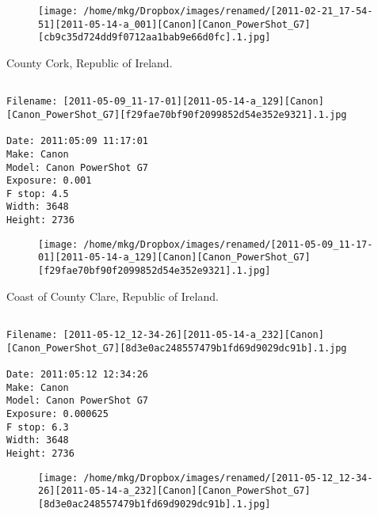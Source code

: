 \begin{figure}
\texttt{[image: /home/mkg/Dropbox/images/renamed/[2011-02-21\_17-54-51][2011-05-14-a\_001][Canon][Canon\_PowerShot\_G7][cb9c35d724dd9f0712aa1bab9e66d0fc].1.jpg]}
\end{figure}
    
\clearpage
\onecolumn
\noindent County Cork, Republic of Ireland.
\noindent
\begin{lstlisting}

Filename: [2011-05-09_11-17-01][2011-05-14-a_129][Canon][Canon_PowerShot_G7][f29fae70bf90f2099852d54e352e9321].1.jpg

Date: 2011:05:09 11:17:01
Make: Canon
Model: Canon PowerShot G7
Exposure: 0.001
F stop: 4.5
Width: 3648
Height: 2736
\end{lstlisting}
\clearpage

\begin{figure}
\texttt{[image: /home/mkg/Dropbox/images/renamed/[2011-05-09\_11-17-01][2011-05-14-a\_129][Canon][Canon\_PowerShot\_G7][f29fae70bf90f2099852d54e352e9321].1.jpg]}
\end{figure}
    
\clearpage
\onecolumn
\noindent Coast of County Clare, Republic of Ireland.
\noindent
\begin{lstlisting}

Filename: [2011-05-12_12-34-26][2011-05-14-a_232][Canon][Canon_PowerShot_G7][8d3e0ac248557479b1fd69d9029dc91b].1.jpg

Date: 2011:05:12 12:34:26
Make: Canon
Model: Canon PowerShot G7
Exposure: 0.000625
F stop: 6.3
Width: 3648
Height: 2736
\end{lstlisting}
\clearpage

\begin{figure}
\texttt{[image: /home/mkg/Dropbox/images/renamed/[2011-05-12\_12-34-26][2011-05-14-a\_232][Canon][Canon\_PowerShot\_G7][8d3e0ac248557479b1fd69d9029dc91b].1.jpg]}
\end{figure}
    
